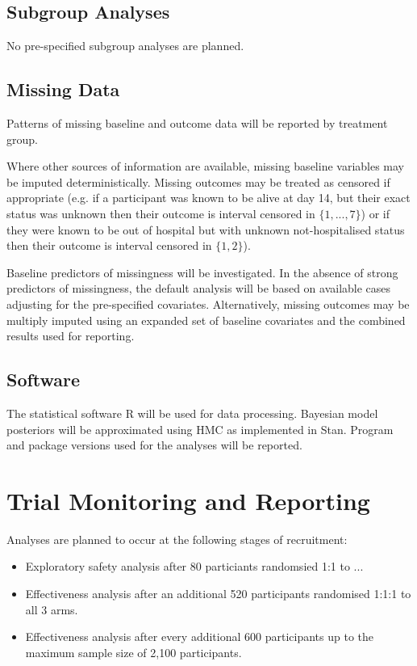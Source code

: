 \documentclass[11pt,parskip=half-]{scrartcl}
\begin{document}
\subsection{Subgroup Analyses}
No pre-specified subgroup analyses are planned.

\subsection{Missing Data}
Patterns of missing baseline and outcome data will be reported by treatment group.

Where other sources of information are available, missing baseline variables may be imputed deterministically. Missing outcomes may be treated as censored if appropriate (e.g. if a participant was known to be alive at day 14, but their exact status was unknown then their outcome is interval censored in $\{1,...,7\}$) or if they were known to be out of hospital but with unknown not-hospitalised status then their outcome is interval censored in $\{1,2\}$).

Baseline predictors of missingness will be investigated. In the absence of strong predictors of missingness, the default analysis will be based on available cases adjusting for the pre-specified covariates. Alternatively, missing outcomes may be multiply imputed using an expanded set of baseline covariates and the combined results used for reporting.

\subsection{Software}
The statistical software R will be used for data processing. Bayesian model posteriors will be approximated using HMC as implemented in Stan. Program and package versions used for the analyses will be reported.

\clearpage

\section{Trial Monitoring and Reporting}

Analyses are planned to occur at the following stages of recruitment:

\begin{itemize}
    \item Exploratory safety analysis after 80 particiants randomsied 1:1 to ...
    \item Effectiveness analysis after an additional 520 participants randomised 1:1:1 to all 3 arms.
    \item Effectiveness analysis after every additional 600 participants up to the maximum sample size of 2,100 participants.
\end{itemize}
\end{document}
